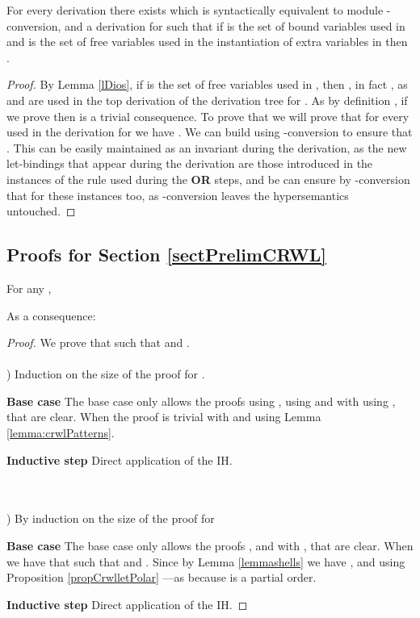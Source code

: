 \begin{lemma}\label{LAlfCrwlP}
For every  derivation  there exists  which is syntactically equivalent to  module
-conversion, and a  derivation for  such
that if  is the set of bound variables used in  and
 is the set of free variables used in the instantiation of extra
variables in  then .
\end{lemma}
\begin{proof}\label{DEMO_LAlfCrwlP}By Lemma \ref{lDios}, if  is the set of free variables used in , then , in fact , as  and  are used in the top derivation of the
derivation tree for . As by definition , if we prove  then
 is a trivial consequence. To
prove that we will prove that for every  used in the
derivation for  we have . We can build
 using -conversion to ensure that . This can be easily maintained as an invariant during the derivation,
as the new let-bindings that appear during the derivation are those
introduced in the instances of the rule used during the \textbf{OR} steps, and
be can ensure by -conversion that  for
these instances too, as -conversion leaves the hypersemantics
untouched.
\end{proof}


\subsection{Proofs for Section \ref{sectPrelimCRWL}}

For any , 

As a consequence: 

\begin{proof}\label{DEMO_thCompoCrwl}
We prove that  such that  and .
~\\~\\
) Induction on the size of the proof for .

{\bf Base case} The base case only allows the proofs  using ,  using  and  with  using , that are clear. When  the proof is trivial with  and using Lemma \ref{lemma:crwlPatterns}.

{\bf Inductive step} Direct application of the IH.

~\\~\\
) By induction on the size of the proof for 

{\bf Base case} The base case only allows the proofs ,  and  with , that are clear. When  we have that  such that  and . Since  by Lemma \ref{lemmashells} we have , and using Proposition \ref{propCrwlletPolar}  ---as  because  is a partial order.

{\bf Inductive step} Direct application of the IH.



\end{proof}

